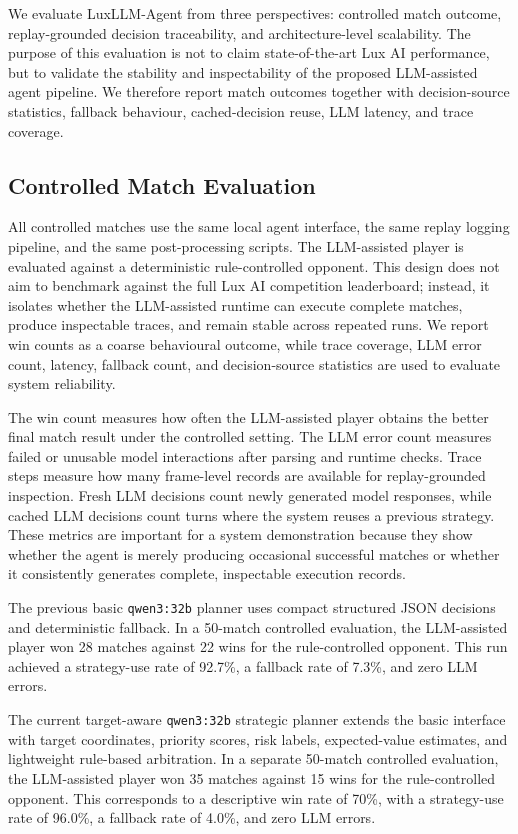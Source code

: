 \documentclass[11pt]{article}
\begin{document}
We evaluate LuxLLM-Agent from three perspectives: controlled match outcome, replay-grounded decision traceability, and architecture-level scalability. The purpose of this evaluation is not to claim state-of-the-art Lux AI performance, but to validate the stability and inspectability of the proposed LLM-assisted agent pipeline. We therefore report match outcomes together with decision-source statistics, fallback behaviour, cached-decision reuse, LLM latency, and trace coverage.

\subsection{Controlled Match Evaluation}

All controlled matches use the same local agent interface, the same replay logging pipeline, and the same post-processing scripts. The LLM-assisted player is evaluated against a deterministic rule-controlled opponent. This design does not aim to benchmark against the full Lux AI competition leaderboard; instead, it isolates whether the LLM-assisted runtime can execute complete matches, produce inspectable traces, and remain stable across repeated runs. We report win counts as a coarse behavioural outcome, while trace coverage, LLM error count, latency, fallback count, and decision-source statistics are used to evaluate system reliability.

The win count measures how often the LLM-assisted player obtains the better final match result under the controlled setting. The LLM error count measures failed or unusable model interactions after parsing and runtime checks. Trace steps measure how many frame-level records are available for replay-grounded inspection. Fresh LLM decisions count newly generated model responses, while cached LLM decisions count turns where the system reuses a previous strategy. These metrics are important for a system demonstration because they show whether the agent is merely producing occasional successful matches or whether it consistently generates complete, inspectable execution records.

The previous basic \texttt{qwen3:32b} planner uses compact structured JSON decisions and deterministic fallback. In a 50-match controlled evaluation, the LLM-assisted player won 28 matches against 22 wins for the rule-controlled opponent. This run achieved a strategy-use rate of 92.7\%, a fallback rate of 7.3\%, and zero LLM errors.

The current target-aware \texttt{qwen3:32b} strategic planner extends the basic interface with target coordinates, priority scores, risk labels, expected-value estimates, and lightweight rule-based arbitration. In a separate 50-match controlled evaluation, the LLM-assisted player won 35 matches against 15 wins for the rule-controlled opponent. This corresponds to a descriptive win rate of 70\%, with a strategy-use rate of 96.0\%, a fallback rate of 4.0\%, and zero LLM errors.
\end{document}
